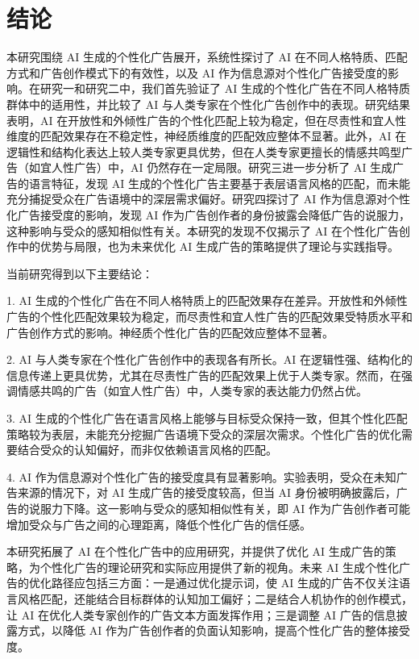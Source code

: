 \chapter{结论}
本研究围绕 AI 生成的个性化广告展开，系统性探讨了 AI 在不同人格特质、匹配方式和广告创作模式下的有效性，以及 AI 作为信息源对个性化广告接受度的影响。在研究一和研究二中，我们首先验证了 AI 生成的个性化广告在不同人格特质群体中的适用性，并比较了 AI 与人类专家在个性化广告创作中的表现。研究结果表明，AI 在开放性和外倾性广告的个性化匹配上较为稳定，但在尽责性和宜人性维度的匹配效果存在不稳定性，神经质维度的匹配效应整体不显著。此外，AI 在逻辑性和结构化表达上较人类专家更具优势，但在人类专家更擅长的情感共鸣型广告（如宜人性广告）中，AI 仍然存在一定局限。研究三进一步分析了 AI 生成广告的语言特征，发现 AI 生成的个性化广告主要基于表层语言风格的匹配，而未能充分捕捉受众在广告语境中的深层需求偏好。研究四探讨了 AI 作为信息源对个性化广告接受度的影响，发现 AI 作为广告创作者的身份披露会降低广告的说服力，这种影响与受众的感知相似性有关。本研究的发现不仅揭示了 AI 在个性化广告创作中的优势与局限，也为未来优化 AI 生成广告的策略提供了理论与实践指导。

当前研究得到以下主要结论：

1. AI 生成的个性化广告在不同人格特质上的匹配效果存在差异。开放性和外倾性广告的个性化匹配效果较为稳定，而尽责性和宜人性广告的匹配效果受特质水平和广告创作方式的影响。神经质个性化广告的匹配效应整体不显著。

2. AI 与人类专家在个性化广告创作中的表现各有所长。AI 在逻辑性强、结构化的信息传递上更具优势，尤其在尽责性广告的匹配效果上优于人类专家。然而，在强调情感共鸣的广告（如宜人性广告）中，人类专家的表达能力仍然占优。

3. AI 生成的个性化广告在语言风格上能够与目标受众保持一致，但其个性化匹配策略较为表层，未能充分挖掘广告语境下受众的深层次需求。个性化广告的优化需要结合受众的认知偏好，而非仅依赖语言风格的匹配。

4. AI 作为信息源对个性化广告的接受度具有显著影响。实验表明，受众在未知广告来源的情况下，对 AI 生成广告的接受度较高，但当 AI 身份被明确披露后，广告的说服力下降。这一影响与受众的感知相似性有关，即 AI 作为广告创作者可能增加受众与广告之间的心理距离，降低个性化广告的信任感。

本研究拓展了 AI 在个性化广告中的应用研究，并提供了优化 AI 生成广告的策略，为个性化广告的理论研究和实际应用提供了新的视角。未来 AI 生成个性化广告的优化路径应包括三方面：一是通过优化提示词，使 AI 生成的广告不仅关注语言风格匹配，还能结合目标群体的认知加工偏好；二是结合人机协作的创作模式，让 AI 在优化人类专家创作的广告文本方面发挥作用；三是调整 AI 广告的信息披露方式，以降低 AI 作为广告创作者的负面认知影响，提高个性化广告的整体接受度。